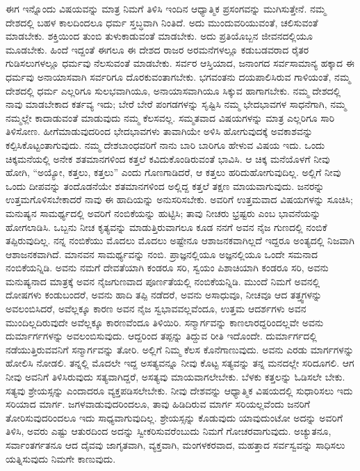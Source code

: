 ಈಗ ಇನ್ನೊಂದು ವಿಷಯವನ್ನು ಮಾತ್ರ ನಿಮಗೆ ತಿಳಿಸಿ ಇಂದಿನ ಆಧ್ಯಾತ್ಮಿಕ ಪ್ರಸಂಗವನ್ನು ಮುಗಿಸುತ್ತೇನೆ. ನಮ್ಮ ದೇಶದಲ್ಲಿ ಬಹಳ ಕಾಲದಿಂದಲೂ ಧರ್ಮ ಸ್ತಬ್ಧವಾಗಿ ನಿಂತಿದೆ. ಅದು ಮುಂದುವರಿಯುವಂತೆ, ಚಲಿಸುವಂತೆ ಮಾಡಬೇಕು. ಶಕ್ತಿಯಿಂದ ತುಂಬಿ ತುಳುಕಾಡುವಂತೆ ಮಾಡಬೇಕು. ಅದು ಪ್ರತಿಯೊಬ್ಬನ ಜೀವನದಲ್ಲಿಯೂ ಮೂಡಬೇಕು. ಹಿಂದೆ ಇದ್ದಂತೆ ಈಗಲೂ ಈ ದೇಶದ ರಾಜರ ಅರಮನೆಗಳಲ್ಲೂ ಕಡುಬಡವರಾದ ರೈತರ ಗುಡಿಸಲುಗಳಲ್ಲೂ ಧರ್ಮವು ನೆಲಸುವಂತೆ ಮಾಡಬೇಕು. ಸರ್ವರ ಆಸ್ತಿಯಾದ, ಜನಾಂಗದ ಸರ್ವಸಾಮಾನ್ಯ ಹಕ್ಕಾದ ಈ ಧರ್ಮವು ಅನಾಯಾಸವಾಗಿ ಸರ್ವರಿಗೂ ದೊರಕುವಂತಾಗಬೇಕು. ಭಗವಂತನು ದಯಪಾಲಿಸಿರುವ ಗಾಳಿಯಂತೆ, ನಮ್ಮ ದೇಶದಲ್ಲಿ ಧರ್ಮ ಎಲ್ಲರಿಗೂ ಸುಲಭವಾಗಿಯೂ, ಅನಾಯಾಸವಾಗಿಯೂ ಸಿಕ್ಕುವ ಹಾಗಾಗಬೇಕು. ನಮ್ಮ ದೇಶದಲ್ಲಿ ನಾವು ಮಾಡಬೇಕಾದ ಕರ್ತವ್ಯ ಇದು; ಬೇರೆ ಬೇರೆ ಪಂಗಡಗಳನ್ನು ಸೃಷ್ಟಿಸಿ ನಮ್ಮ ಭೇದಭಾವಗಳ ಸಾಧನೆಗಾಗಿ, ನಮ್ಮ ನಮ್ಮಲ್ಲೇ ಕಾದಾಡುವಂತೆ ಮಾಡುವುದು ನಮ್ಮ ಕೆಲಸವಲ್ಲ. ಸಮ್ಮತವಾದ ವಿಷಯಗಳನ್ನು ಮಾತ್ರ ಎಲ್ಲರಿಗೂ ಸಾರಿ ತಿಳಿಸೋಣ. ಹೀಗೆ\break ಮಾಡುವುದರಿಂದ ಭೇದಭಾವಗಳು ತಾವಾಗಿಯೇ ಅಳಿಸಿ ಹೋಗುವುದಕ್ಕೆ ಅವಕಾಶವನ್ನು ಕಲ್ಪಿಸಿಕೊಟ್ಟಂತಾಗುವುದು. ನಮ್ಮ ದೇಶಬಾಂಧವರಿಗೆ ನಾನು ಬಾರಿ ಬಾರಿಗೂ ಹೇಳುವ ವಿಷಯ ಇದು. ಒಂದು ಚಿಕ್ಕಮನೆಯಲ್ಲಿ ಅನೇಕ ಶತಮಾನಗಳಿಂದ ಕತ್ತಲೆ ಕವಿದುಕೊಂಡಿರುವಂತೆ ಭಾವಿಸಿ. ಆ ಚಿಕ್ಕ ಮನೆಯೊಳಗೆ ನೀವು ಹೋಗಿ, “ಅಯ್ಯೋ, ಕತ್ತಲು, ಕತ್ತಲು” ಎಂದು ಗೊಣಗಾಡಿದರೆ, ಆ ಕತ್ತಲು ಹರಿದುಹೋಗುವುದಿಲ್ಲ. ಅಲ್ಲಿಗೆ ನೀವು ಒಂದು ದೀಪವನ್ನು ತಂದೊಡನೆಯೇ ಶತಮಾನಗಳಿಂದ ಅಲ್ಲಿದ್ದ ಕತ್ತಲೆ ತಕ್ಷಣ ಮಾಯವಾಗುವುದು. ಜನರನ್ನು ಉತ್ತಮಗೊಳಿಸಬೇಕಾದರೆ ನಾವು ಈ ಹಾದಿಯನ್ನು ಅನುಸರಿಸಬೇಕು. ಅವರಿಗೆ ಉತ್ತಮವಾದ ವಿಷಯಗಳನ್ನು ಸೂಚಿಸಿ; ಮನುಷ್ಯನ ಸಾಮರ್ಥ್ಯದಲ್ಲಿ ಅವರಿಗೆ ನಂಬಿಕೆಯನ್ನು ಹುಟ್ಟಿಸಿ; ತಾವು ನೀಚರು ಭ್ರಷ್ಟರು ಎಂಬ ಭಾವನೆಯನ್ನು ಹೋಗಲಾಡಿಸಿ. ಒಬ್ಬನು ನೀಚ ಕೃತ್ಯವನ್ನು ಮಾಡುತ್ತಿರುವಾಗಲೂ ಕೂಡ ನನಗೆ ಅವನ ನೈಜ ಗುಣದಲ್ಲಿ ನಂಬಿಕೆ ತಪ್ಪಿರುವುದಿಲ್ಲ. ನನ್ನ ನಂಬಿಕೆಯು ಮೊದಲು ಮೊದಲು ಅಷ್ಟೇನೂ ಆಶಾಜನಕವಾಗಿಲ್ಲದೆ ಇದ್ದರೂ ಅಂತ್ಯದಲ್ಲಿ ನಿಜವಾಗಿ ಆಶಾಜನಕವಾಗಿದೆ. ಮಾನವನ ಸಾಮರ್ಥ್ಯವನ್ನು ನಂಬಿ. ಪ್ರಾಜ್ಞನಲ್ಲಿಯೂ ಅಜ್ಞನಲ್ಲಿಯೂ ಒಂದೇ ಸಮನಾದ ನಂಬಿಕೆಯನ್ನಿಡಿ. ಅವನು ನಮಗೆ ದೇವತೆಯಾಗಿ ಕಂಡರೂ ಸರಿ, ಸ್ವಯಂ ಪಿಶಾಚಿಯಾಗಿ ಕಂಡರೂ ಸರಿ, ಅವನು ಮನುಷ್ಯನಾದ ಮಾತ್ರಕ್ಕೆ ಅವನ ನೈಜಗುಣವಾದ ಪೂರ್ಣತೆಯಲ್ಲಿ ನಂಬಿಕೆಯನ್ನಿಡಿ. ಮುಂದೆ ನಿಮಗೆ ಅವನಲ್ಲಿ ದೋಷಗಳು ಕಂಡುಬಂದರೆ, ಅವನು ಹಾದಿ ತಪ್ಪಿ ನಡೆದರೆ, ಅವನು ಅಸಾಧುವೂ, ನೀಚವೂ ಆದ ತತ್ತ್ವಗಳನ್ನು ಅವಲಂಬಿಸಿದರೆ, ಅವೆಲ್ಲಕ್ಕೂ ಕಾರಣ ಅವನ ನೈಜ ಸ್ವಭಾವವಲ್ಲವೆಂದೂ, ಉತ್ತಮ ಆದರ್ಶಗಳು ಅವನ ಮುಂದಿಲ್ಲದಿರುವುದೇ ಅವೆಲ್ಲಕ್ಕೂ ಕಾರಣವೆಂದೂ ತಿಳಿಯಿರಿ. ಸನ್ಮಾರ್ಗವನ್ನು ಕಾಣಲಾರದ್ದರಿಂದಲ್ಲವೇ ಅವನು ದುರ್ಮಾರ್ಗಗಳನ್ನು ಅವಲಂಬಿಸುವುದು. ಆದ್ದರಿಂದ ತಪ್ಪನ್ನು ತಿದ್ದುವ ರೀತಿ ಇದೊಂದೇ. ದುರ್ಮಾರ್ಗದಲ್ಲಿ ನಡೆಯುತ್ತಿರುವವನಿಗೆ ಸನ್ಮಾರ್ಗವನ್ನು ತೋರಿ. ಅಲ್ಲಿಗೆ ನಿಮ್ಮ ಕೆಲಸ ಕೊನೆಗಾಣುವುದು. ಅವನು ಎರಡು ಮಾರ್ಗಗಳನ್ನು ಹೋಲಿಸಿ ನೋಡಲಿ. ತನ್ನಲ್ಲಿ ಮೊದಲೇ ಇದ್ದ ಅಸತ್ಯವನ್ನೂ ನೀವು ಕೊಟ್ಟ ಸತ್ಯವನ್ನು ತನ್ನ ಮನದಲ್ಲೇ ಸರಿದೂಗಲಿ. ಆಗ ನೀವು ಅವನಿಗೆ ತಿಳಿಸಿರುವುದು ಸತ್ಯವಾಗಿದ್ದರೆ, ಅಸತ್ಯವು ಮಾಯವಾಗಲೇಬೇಕು. ಬೆಳಕು ಕತ್ತಲನ್ನು ಓಡಿಸಲೇ ಬೇಕು. ಸತ್ಯವು ಶ್ರೇಯಸ್ಸನ್ನು ಎಂದಾದರೂ ವ್ಯಕ್ತಪಡಿಸಲೇಬೇಕು. ನೀವು ದೇಶವನ್ನು ಆಧ್ಯಾತ್ಮಿಕ ವಿಷಯದಲ್ಲಿ ಸುಧಾರಿಸಲು ಇದು ಸರಿಯಾದ ಮಾರ್ಗ. ಜಗಳವಾಡುವುದರಿಂದಲೂ, ತಾವು ಹಿಡಿದಿರುವ ಮಾರ್ಗ ಸರಿಯಲ್ಲವೆಂದು ಜನರಿಗೆ ತೋರಿಸುವುದರಿಂದಲೂ ಇದು ಸಾಧ್ಯವಾಗುವುದಿಲ್ಲ. ಶ್ರೇಯಸ್ಸನ್ನು ಕೊಡುವುದು ಯಾವುದುಂಟೋ ಅದನ್ನು ಅವರಿಗೆ ತಿಳಿಸಿ, ಅವರು ಎಷ್ಟು ಆತುರದಿಂದ ಅದನ್ನು ಸ್ವೀಕರಿಸುವರೆಂಬುದು ನಿಮಗೆ ಗೋಚರವಾಗುವುದು. ಅಚ್ಯುತನೂ, ಸರ್ವಾಂತರ್ಗತನೂ ಆದ ದೈವವು ಜಾಗೃತವಾಗಿ, ವ್ಯಕ್ತವಾಗಿ, ಮಂಗಳಕರವಾದ, ಮಹತ್ತಾದ ಸರ್ವಸ್ವವನ್ನು ಸಾಧಿಸಲು ಯತ್ನಿಸುವುದು ನಿಮಗೇ ಕಾಣುವುದು.

